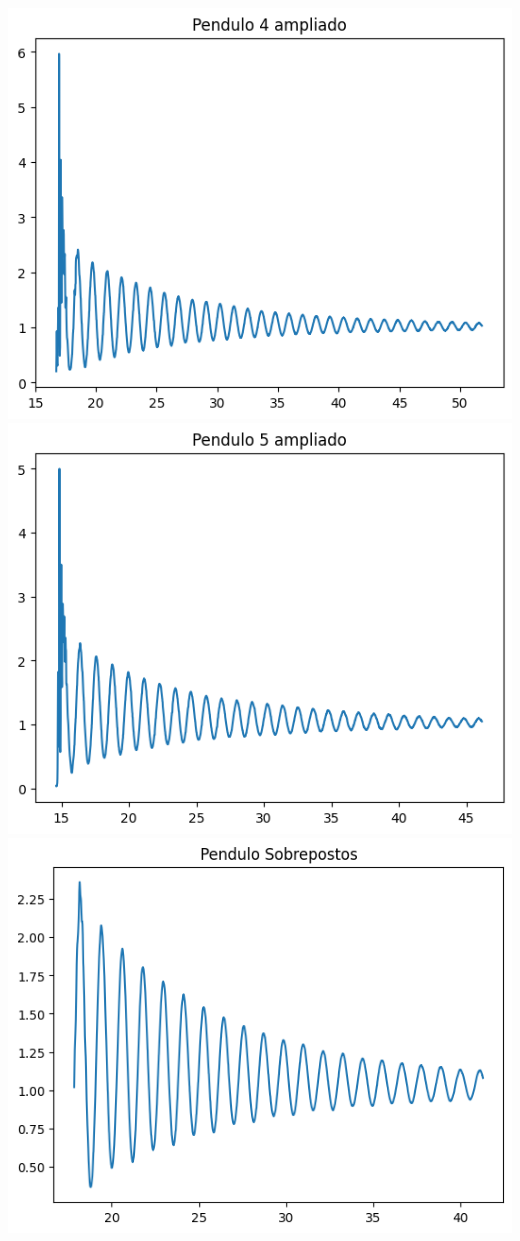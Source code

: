 \documentclass{article}
\begin{document}
\includegraphics{P4.png}\\
\includegraphics{P5.png}\\
\includegraphics{P-sobreposto.png}\\
\end{document}
